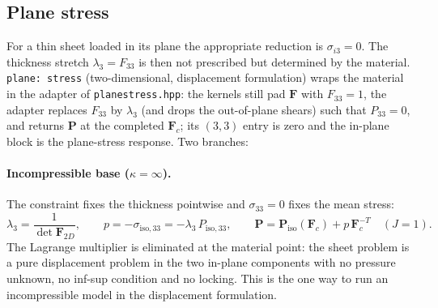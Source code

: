 \documentclass[11pt]{article}
\newcommand{\bP}{\bm{P}}
\newcommand{\bF}{\bm{F}}
\DeclareRobustCommand{\code}[1]{{\def\_{\textunderscore\allowbreak}\texttt{#1}}}
\DeclareRobustCommand{\file}[1]{{\def\_{\textunderscore\allowbreak}\texttt{#1}}}
\begin{document}
\subsection{Plane stress}

For a thin sheet loaded in its plane the appropriate reduction is
$\sigma_{i3} = 0$.  The thickness stretch $\lambda_3 = F_{33}$ is then not
prescribed but determined by the material.  \code{plane: stress}
(two-dimensional, displacement formulation) wraps the material in the
adapter of \file{plane\_stress.hpp}: the kernels still pad $\bF$ with
$F_{33} = 1$, the adapter replaces $F_{33}$ by $\lambda_3$ (and drops the
out-of-plane shears) such that $P_{33} = 0$, and returns $\bP$ at the
completed $\bF_c$; its $(3,3)$ entry is zero and the in-plane block is the
plane-stress response.  Two branches:

\paragraph{Incompressible base ($\kappa = \infty$).}
The constraint fixes the thickness pointwise and $\sigma_{33} = 0$ fixes
the mean stress:
\begin{equation}
  \lambda_3 = \frac{1}{\det\bF_{2D}}, \qquad
  p = -\sigma_{\mathrm{iso},33} = -\lambda_3\,P_{\mathrm{iso},33}, \qquad
  \bP = \bP_{\mathrm{iso}}(\bF_c) + p\,\bF_c^{-T}
  \quad (J = 1).
  \label{eq:psinc}
\end{equation}
The Lagrange multiplier is eliminated at the material point: the sheet
problem is a pure displacement problem in the two in-plane components with
no pressure unknown, no inf-sup condition and no locking.  This is the one
way to run an incompressible model in the displacement formulation.
\end{document}
